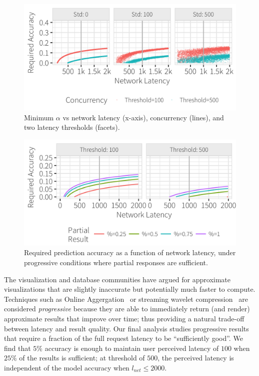 \begin{figure}[h]
	\centering
	\includegraphics[width=1\columnwidth]{figures/model_std}
 	\caption{Minimum $\alpha$ vs network latency (x-axis), concurrency (lines), and two latency thresholds (facets).}
  \label{fig:model_std}
\end{figure}

\begin{figure}[h]
	\centering
	\includegraphics[width=1\columnwidth]{figures/model_partial}
 	\caption{Required prediction accuracy as a function of network latency, under progressive conditions where partial responses are sufficient.}
    \label{fig:model_partial}
\end{figure}


The visualization and database communities have argued for approximate visualizations that are slightly inaccurate but potentially much faster to compute.  Techniques such as Online Aggergation~\cite{control,wanderjoin} or streaming wavelet compression~\cite{} are considered {\it progressive} because they are able to immediately return (and render) approximate results that improve over time; thus providing a natural trade-off between latency and result quality.  Our final analysis studies progressive results that require a fraction of the full request latency to be ``sufficiently good''.
 We find that $5\%$ accuracy is enough to maintain user perceived latency of $100$ when $25\%$ of the results is sufficient; at threshold of $500$, the perceived latency is independent of the model accuracy when $l_{net}\le 2000$.






